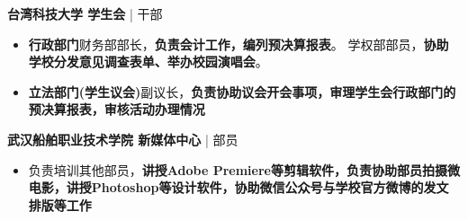 \documentclass{resume}
\begin{document}
  \datedsubsection
  {\textbf{台湾科技大学 学生会} | 干部}
  {}
  \begin{itemize}
    \item \textbf{行政部门}财务部部长，\textbf{负责会计工作，编列预决算报表}。
    学权部部员，\textbf{协助学校分发意见调查表单、举办校园演唱会}。
    \item \textbf{立法部门(学生议会)}副议长，\textbf{负责协助议会开会事项，审理学生会行政部门的预决算报表，审核活动办理情况}
  \end{itemize}

  \datedsubsection
  {\textbf{武汉船舶职业技术学院 新媒体中心} | 部员}
  {}
  \begin{itemize}
    \item 负责培训其他部员，\textbf{讲授Adobe Premiere等剪辑软件，负责协助部员拍摄微电影，讲授Photoshop等设计软件，协助微信公众号与学校官方微博的发文排版等工作}
  \end{itemize}
\end{document}
